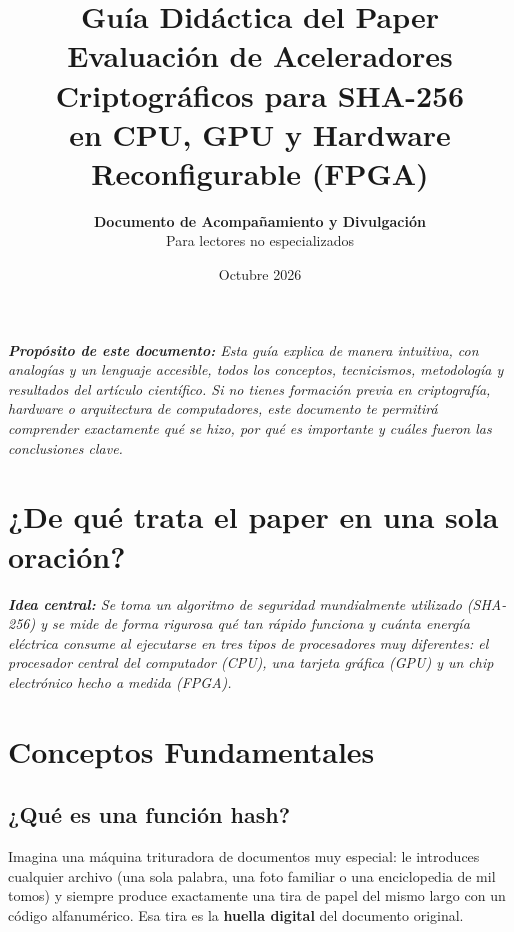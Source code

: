 \documentclass[11pt,a4paper]{article}
\title{\Huge\bfseries\color{primary} Guía Didáctica del Paper\\[0.3em]
\Large\color{secondary} Evaluación de Aceleradores Criptográficos para SHA-256\\en CPU, GPU y Hardware Reconfigurable (FPGA)}
\author{\textbf{Documento de Acompañamiento y Divulgación}\\Para lectores no especializados}
\date{Octubre 2026}
\newcommand{\destacado}[1]{%
    \par\vspace{0.8em}%
    \noindent\colorbox{boxbg}{%
        \parbox{\dimexpr\textwidth-2\fboxsep\relax}{%
            \vspace{0.4em}%
            \raggedright\itshape #1%
            \vspace{0.4em}%
        }%
    }%
    \par\vspace{0.8em}%
}
\begin{document}
\maketitle

\destacado{\textbf{Propósito de este documento:} Esta guía explica de manera intuitiva, con analogías y un lenguaje accesible, todos los conceptos, tecnicismos, metodología y resultados del artículo científico. Si no tienes formación previa en criptografía, hardware o arquitectura de computadores, este documento te permitirá comprender exactamente qué se hizo, por qué es importante y cuáles fueron las conclusiones clave.}

\tableofcontents
\newpage

\section{¿De qué trata el paper en una sola oración?}

\destacado{\textbf{Idea central:} Se toma un algoritmo de seguridad mundialmente utilizado (SHA-256) y se mide de forma rigurosa qué tan rápido funciona y cuánta energía eléctrica consume al ejecutarse en tres tipos de procesadores muy diferentes: el procesador central del computador (CPU), una tarjeta gráfica (GPU) y un chip electrónico hecho a medida (FPGA).}

\section{Conceptos Fundamentales}

\subsection{¿Qué es una función hash?}
Imagina una máquina trituradora de documentos muy especial: le introduces cualquier archivo (una sola palabra, una foto familiar o una enciclopedia de mil tomos) y siempre produce exactamente una tira de papel del mismo largo con un código alfanumérico. Esa tira es la \textbf{huella digital} del documento original.
\end{document}
